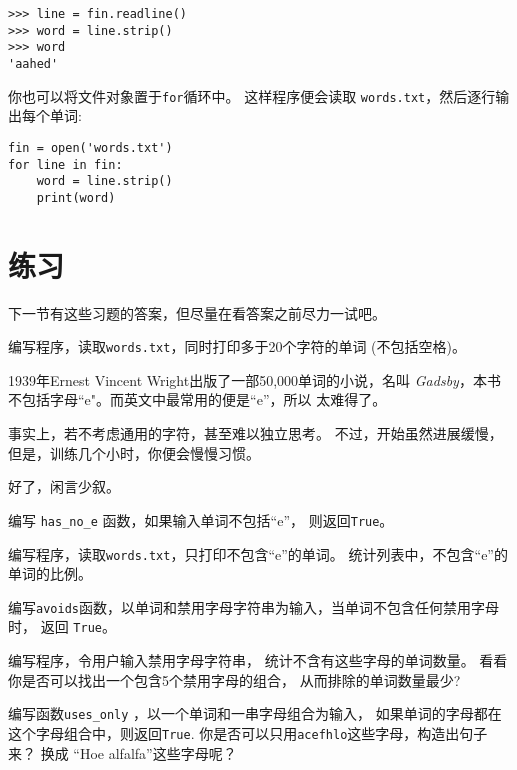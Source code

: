 \documentclass[10pt]{book}
\begin{document}
\begin{verbatim}
>>> line = fin.readline()
>>> word = line.strip()
>>> word
'aahed'
\end{verbatim}
%
你也可以将文件对象置于{\tt for}循环中。
这样程序便会读取 {\tt words.txt}，然后逐行输出每个单词:

\begin{verbatim}
fin = open('words.txt')
for line in fin:
    word = line.strip()
    print(word)
\end{verbatim}
%

\section{练习}
下一节有这些习题的答案，但尽量在看答案之前尽力一试吧。

\begin{exercise}
编写程序，读取{\tt words.txt}，同时打印多于20个字符的单词
(不包括空格)。

\end{exercise}

\begin{exercise}

1939年Ernest Vincent Wright出版了一部50,000单词的小说，名叫
{\em Gadsby}，本书不包括字母``e"。而英文中最常用的便是``e''，所以
太难得了。

事实上，若不考虑通用的字符，甚至难以独立思考。
不过，开始虽然进展缓慢，但是，训练几个小时，你便会慢慢习惯。

好了，闲言少叙。

编写 \verb"has_no_e" 函数，如果输入单词不包括``e''， 则返回{\tt True}。

编写程序，读取{\tt words.txt}，只打印不包含``e''的单词。
统计列表中，不包含``e''的单词的比例。

\end{exercise}


\begin{exercise} 

编写{\tt avoids}函数，以单词和禁用字母字符串为输入，当单词不包含任何禁用字母时，
返回 {\tt True}。

编写程序，令用户输入禁用字母字符串，
统计不含有这些字母的单词数量。
看看你是否可以找出一个包含5个禁用字母的组合，
从而排除的单词数量最少?

\end{exercise}



\begin{exercise}

编写函数\verb"uses_only" ，以一个单词和一串字母组合为输入，
如果单词的字母都在这个字母组合中，则返回{\tt True}.
你是否可以只用{\tt acefhlo}这些字母，构造出句子来？
换成 ``Hoe alfalfa''这些字母呢？

\end{exercise}
\end{document}
